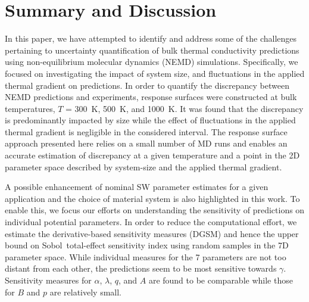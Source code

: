 \section{Summary and Discussion}
\label{sec:disc}

In this paper, we have attempted to identify and address some of the challenges
pertaining to uncertainty quantification of bulk thermal conductivity predictions 
using non-equilibrium molecular dynamics (NEMD) simulations. Specifically, we focused
on investigating the impact of system size, and fluctuations in the applied thermal
gradient on predictions. In order to quantify the discrepancy between NEMD
predictions and experiments, response surfaces were  
constructed at bulk temperatures, $T$ = 300~K, 500~K, and 1000~K.  
It was found that the discrepancy is predominantly impacted by size while the 
effect of fluctuations in the applied thermal gradient is negligible in the considered
interval. The response surface approach presented here relies on a small number of
MD runs and enables an accurate estimation of discrepancy at a given temperature
and a point in the 2D parameter space described by system-size and the applied
thermal gradient. 

A possible enhancement of nominal SW parameter estimates for a given application
and the choice of material system is also highlighted in this work. To enable this,
we focus our efforts on understanding the sensitivity of predictions on individual potential
parameters. In order to reduce the computational effort, we estimate the derivative-based
sensitivity measures (DGSM) and hence the upper bound
on Sobol\textquotesingle~total-effect sensitivity index using random samples in the 7D parameter space. 
While individual measures for the 7 parameters are not too distant from each other, the predictions
seem to be most sensitive towards $\gamma$. Sensitivity measures for $\alpha$,
$\lambda$, $q$, and $A$ are found to be comparable while those for $B$ and $p$
are relatively small. 

